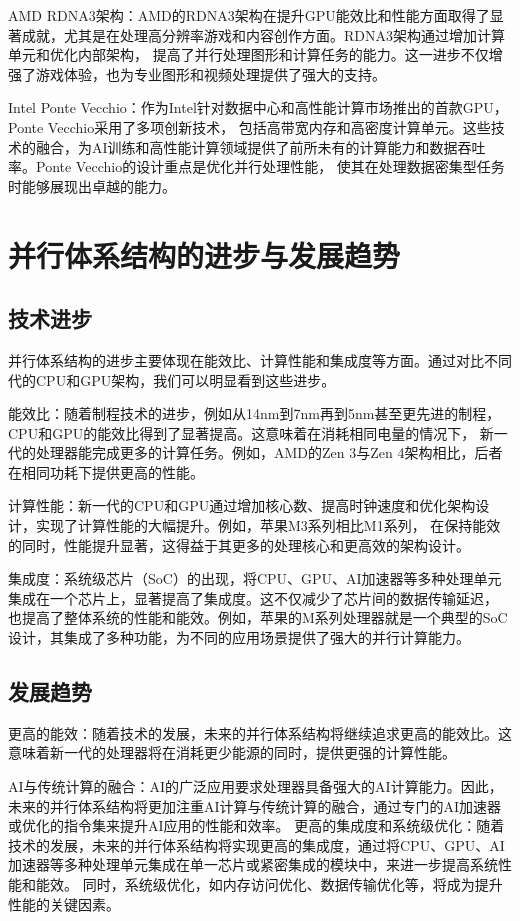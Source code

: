 \documentclass{ctexart}
\begin{document}
AMD RDNA3架构：AMD的RDNA3架构在提升GPU能效比和性能方面取得了显著成就，尤其是在处理高分辨率游戏和内容创作方面。RDNA3架构通过增加计算单元和优化内部架构，
提高了并行处理图形和计算任务的能力。这一进步不仅增强了游戏体验，也为专业图形和视频处理提供了强大的支持。\cite{amdOfficial}

Intel Ponte Vecchio：作为Intel针对数据中心和高性能计算市场推出的首款GPU，Ponte Vecchio采用了多项创新技术，
包括高带宽内存和高密度计算单元。这些技术的融合，为AI训练和高性能计算领域提供了前所未有的计算能力和数据吞吐率。Ponte Vecchio的设计重点是优化并行处理性能，
使其在处理数据密集型任务时能够展现出卓越的能力。\cite{intelOfficial}
\section{并行体系结构的进步与发展趋势}
\subsection{技术进步}
并行体系结构的进步主要体现在能效比、计算性能和集成度等方面。通过对比不同代的CPU和GPU架构，我们可以明显看到这些进步。

能效比：随着制程技术的进步，例如从14nm到7nm再到5nm甚至更先进的制程，CPU和GPU的能效比得到了显著提高。这意味着在消耗相同电量的情况下，
新一代的处理器能完成更多的计算任务。例如，AMD的Zen 3与Zen 4架构相比，后者在相同功耗下提供更高的性能。

计算性能：新一代的CPU和GPU通过增加核心数、提高时钟速度和优化架构设计，实现了计算性能的大幅提升。例如，苹果M3系列相比M1系列，
在保持能效的同时，性能提升显著，这得益于其更多的处理核心和更高效的架构设计。

集成度：系统级芯片（SoC）的出现，将CPU、GPU、AI加速器等多种处理单元集成在一个芯片上，显著提高了集成度。这不仅减少了芯片间的数据传输延迟，
也提高了整体系统的性能和能效。例如，苹果的M系列处理器就是一个典型的SoC设计，其集成了多种功能，为不同的应用场景提供了强大的并行计算能力。
\subsection{发展趋势}
更高的能效：随着技术的发展，未来的并行体系结构将继续追求更高的能效比。这意味着新一代的处理器将在消耗更少能源的同时，提供更强的计算性能。

AI与传统计算的融合：AI的广泛应用要求处理器具备强大的AI计算能力。因此，未来的并行体系结构将更加注重AI计算与传统计算的融合，通过专门的AI加速器或优化的指令集来提升AI应用的性能和效率。
更高的集成度和系统级优化：随着技术的发展，未来的并行体系结构将实现更高的集成度，通过将CPU、GPU、AI加速器等多种处理单元集成在单一芯片或紧密集成的模块中，来进一步提高系统性能和能效。
同时，系统级优化，如内存访问优化、数据传输优化等，将成为提升性能的关键因素。
\end{document}
